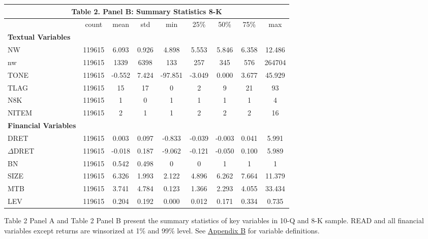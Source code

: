 \begin{table}[H] \label{T2PB}
  \begin{center}
  	    \begin{tabular}{lcccccccc}
  		\multicolumn{9}{c}{\textbf{Table 2. Panel B: Summary Statistics 8-K}} \\
  		\midrule
  		\midrule
  		& count & mean & std & min & 25\% & 50\% & 75\% & max \\
  		\midrule
  		\textbf{Textual Variables} &   &   &   &   &   &   &   &  \\
  		NW & 119615 & 6.093 & 0.926 & 4.898 & 5.553 & 5.846 & 6.358 & 12.486 \\
  		nw & 119615 & 1339 & 6398 & 133 & 257 & 345 & 576 & 264704 \\
  		TONE & 119615 & -0.552 & 7.424 & -97.851 & -3.049 & 0.000 & 3.677 & 45.929 \\
  		TLAG & 119615 & 15 & 17 & 0 & 2 & 9 & 21 & 93 \\
  		N8K & 119615 & 1 & 0 & 1 & 1 & 1 & 1 & 4 \\
  		NITEM & 119615 & 2 & 1 & 1 & 2 & 2 & 2 & 16 \\
  		
  		\textbf{Financial Variables} &   &   &   &   &   &   &   &  \\
  		DRET & 119615 & 0.003 & 0.097 & -0.833 & -0.039 & -0.003 & 0.041 & 5.991 \\
  		$\Delta$DRET & 119615 & -0.018 & 0.187 & -9.062 & -0.121 & -0.050 & 0.100 & 5.989 \\
  		BN & 119615 & 0.542 & 0.498 & 0 & 0 & 1 & 1 & 1 \\
  		SIZE & 119615 & 6.326 & 1.993 & 2.122 & 4.896 & 6.262 & 7.664 & 11.379 \\
  		MTB & 119615 & 3.741 & 4.784 & 0.123 & 1.366 & 2.293 & 4.055 & 33.434 \\
  		LEV & 119615 & 0.204 & 0.192 & 0.000 & 0.012 & 0.171 & 0.334 & 0.735 \\
  		\bottomrule
  		\bottomrule
  	\end{tabular}%
  \end{center}
	\begin{footnotesize}
		\noindent Table 2 Panel A and Table 2 Panel B present the summary statistics of key variables in 10-Q and 8-K sample. READ and all financial variables except returns are winsorized at 1\% and 99\% level. See \hyperref[appb]{Appendix B} for variable definitions.
	\end{footnotesize}
\end{table}%